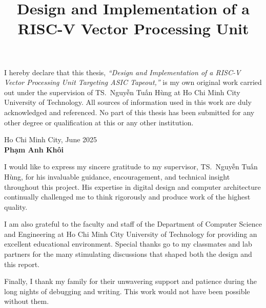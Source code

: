 \documentclass[12pt,a4paper,oneside]{book}
\title{Design and Implementation of a\\[4pt]
       RISC-V Vector Processing Unit}
\numberwithin{equation}{chapter}
\begin{document}
\frontmatter
\coverpage

\begin{declaration}
I hereby declare that this thesis, \textit{``Design and Implementation of a RISC-V Vector
Processing Unit Targeting ASIC Tapeout,''} is my own original work carried out under the
supervision of TS.\ \foreignlanguage{vietnamese}{Nguyễn Tuấn Hùng} at Ho Chi Minh City University of Technology.
All sources of information used in this work are duly acknowledged and referenced. No
part of this thesis has been submitted for any other degree or qualification at this or
any other institution.

\vspace{2.5cm}
\begin{flushright}
Ho Chi Minh City, June 2025\\[1cm]
\textbf{\foreignlanguage{vietnamese}{Phạm Anh Khôi}}
\end{flushright}
\end{declaration}

\begin{acknowledgments}
I would like to express my sincere gratitude to my supervisor, TS.\ \foreignlanguage{vietnamese}{Nguyễn Tuấn Hùng},
for his invaluable guidance, encouragement, and technical insight throughout this project.
His expertise in digital design and computer architecture continually challenged me to
think rigorously and produce work of the highest quality.

I am also grateful to the faculty and staff of the Department of Computer Science and
Engineering at Ho Chi Minh City University of Technology for providing an excellent
educational environment. Special thanks go to my classmates and lab partners for the
many stimulating discussions that shaped both the design and this report.

Finally, I thank my family for their unwavering support and patience during the long
nights of debugging and writing. This work would not have been possible without them.
\end{acknowledgments}
\end{document}
